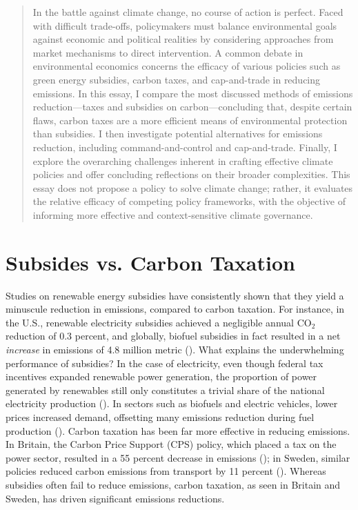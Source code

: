 \documentclass[12pt, a4paper, twoside]{article}
\begin{document}
\maketitle{}

\begin{abstract}
In the battle against climate change, no course of action is perfect. Faced with difficult trade-offs, policymakers must balance environmental goals against economic and political realities by considering approaches from market mechanisms to direct intervention. A common debate in environmental economics concerns the efficacy of various policies such as green energy subsidies, carbon taxes, and cap-and-trade in reducing emissions. In this essay, I compare the most discussed methods of emissions reduction—taxes and subsidies on carbon—concluding that, despite certain flaws, carbon taxes are a more efficient means of environmental protection than subsidies. I then investigate potential alternatives for emissions reduction, including command-and-control and cap-and-trade. Finally, I explore the overarching challenges inherent in crafting effective climate policies and offer concluding reflections on their broader complexities. This essay does not propose a policy to solve climate change; rather, it evaluates the relative efficacy of competing policy frameworks, with the objective of informing more effective and context-sensitive climate governance. 
\end{abstract}

\section{Subsides vs. Carbon Taxation}

Studies on renewable energy subsidies have consistently shown that they yield a minuscule reduction in emissions, compared to carbon taxation. For instance, in the U.S., renewable electricity subsidies achieved a negligible annual CO$_2$ reduction of 0.3 percent, and globally, biofuel subsidies in fact resulted in a net \emph{increase} in emissions of 4.8 million metric (\cite[p.\ 572]{murray2014effective}). What explains the underwhelming performance of subsidies? In the case of electricity, even though federal tax incentives expanded renewable power generation, the proportion of power generated by renewables still only constitutes a trivial share of the national electricity production (\cite[p.\ 70]{nrc2013effects}). In sectors such as biofuels and electric vehicles, lower prices increased demand, offsetting many emissions reduction during fuel production (\cites[p.\ 572]{murray2014effective}{miron2024clean}). Carbon taxation has been far more effective in reducing emissions. In Britain, the Carbon Price Support (CPS) policy, which placed a tax on the power sector, resulted in a 55 percent decrease in emissions (\cite[p.\ 2]{gugler2021effectiveness}); in Sweden, similar policies reduced carbon emissions from transport by 11 percent (\cite[p.\ 1]{andersson2019carbontaxes}). Whereas subsidies often fail to reduce emissions, carbon taxation, as seen in Britain and Sweden, has driven significant emissions reductions.  
\end{document}
